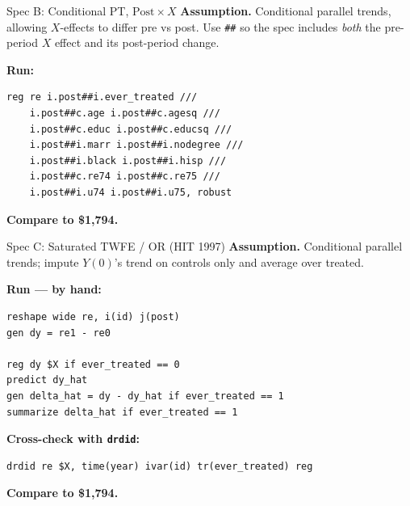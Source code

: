 \documentclass[11pt,aspectratio=169]{beamer}
\begin{document}
\begin{frame}[fragile]{Spec B: Conditional PT, $\text{Post}\times X$}
\textbf{Assumption.} \;Conditional parallel trends, allowing $X$-effects to differ pre vs post. \;Use \texttt{\#\#} so the spec includes \textit{both} the pre-period $X$ effect and its post-period change.
\vspace{0.4em}

\textbf{Run:}
\begin{lstlisting}[language={[ANSI]C},basicstyle=\ttfamily\scriptsize]
reg re i.post##i.ever_treated ///
    i.post##c.age i.post##c.agesq ///
    i.post##c.educ i.post##c.educsq ///
    i.post##i.marr i.post##i.nodegree ///
    i.post##i.black i.post##i.hisp ///
    i.post##c.re74 i.post##c.re75 ///
    i.post##i.u74 i.post##i.u75, robust
\end{lstlisting}

\vspace{0.3em}
\textbf{Compare to \$1,794.} \;
\end{frame}

\begin{frame}[fragile]{Spec C: Saturated TWFE / OR (HIT 1997)}
\textbf{Assumption.} \;Conditional parallel trends; impute $Y(0)$'s trend on controls only and average over treated.
\vspace{0.4em}

\textbf{Run --- by hand:}
\begin{lstlisting}[language={[ANSI]C},basicstyle=\ttfamily\footnotesize]
reshape wide re, i(id) j(post)
gen dy = re1 - re0

reg dy $X if ever_treated == 0
predict dy_hat
gen delta_hat = dy - dy_hat if ever_treated == 1
summarize delta_hat if ever_treated == 1
\end{lstlisting}

\textbf{Cross-check with \texttt{drdid}:}
\begin{lstlisting}[language={[ANSI]C},basicstyle=\ttfamily\footnotesize]
drdid re $X, time(year) ivar(id) tr(ever_treated) reg
\end{lstlisting}

\textbf{Compare to \$1,794.} \;
\end{frame}
\end{document}
